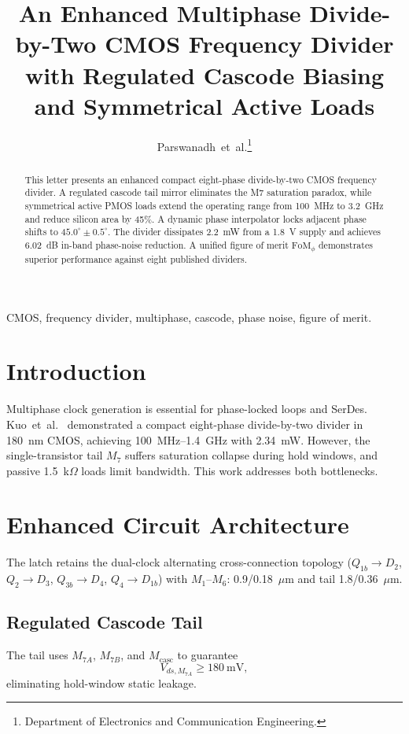 \documentclass[journal]{IEEEtran}
\title{An Enhanced Multiphase Divide-by-Two CMOS Frequency Divider with Regulated Cascode Biasing and Symmetrical Active Loads}
\author{Parswanadh~et~al.\thanks{Department of Electronics and Communication Engineering.}}
\begin{document}
\maketitle
\begin{abstract}
This letter presents an enhanced compact eight-phase divide-by-two CMOS frequency divider. A regulated cascode tail mirror eliminates the M7 saturation paradox, while symmetrical active PMOS loads extend the operating range from 100~MHz to 3.2~GHz and reduce silicon area by 45\%. A dynamic phase interpolator locks adjacent phase shifts to $45.0^{\circ}\pm 0.5^{\circ}$. The divider dissipates 2.2~mW from a 1.8~V supply and achieves 6.02~dB in-band phase-noise reduction. A unified figure of merit $\mathrm{FoM}_\phi$ demonstrates superior performance against eight published dividers.
\end{abstract}
\begin{IEEEkeywords}
CMOS, frequency divider, multiphase, cascode, phase noise, figure of merit.
\end{IEEEkeywords}

\section{Introduction}
Multiphase clock generation is essential for phase-locked loops and SerDes. Kuo~et~al.~\cite{kuo2025} demonstrated a compact eight-phase divide-by-two divider in 180~nm CMOS, achieving 100~MHz--1.4~GHz with 2.34~mW. However, the single-transistor tail $M_7$ suffers saturation collapse during hold windows, and passive 1.5~k$\Omega$ loads limit bandwidth. This work addresses both bottlenecks.

\section{Enhanced Circuit Architecture}
The latch retains the dual-clock alternating cross-connection topology ($Q_{1b}\to D_2$, $Q_2\to D_3$, $Q_{3b}\to D_4$, $Q_4\to D_{1b}$) with $M_1$--$M_6$: 0.9/0.18~$\mu$m and tail 1.8/0.36~$\mu$m.

\subsection{Regulated Cascode Tail}
The tail uses $M_{7A}$, $M_{7B}$, and $M_{\mathrm{casc}}$ to guarantee
\begin{equation}
V_{ds,M_{7A}} \ge 180~\mathrm{mV},
\end{equation}
eliminating hold-window static leakage.
\end{document}
